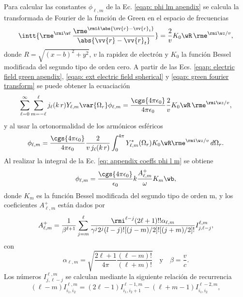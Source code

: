 Para calcular las constantes $\phi_{\ell, m}$ de la Ec. \eqref{eqap: phi lm apendix} se calcula la transformada de Fourier de la función de Green en el espacio de frecuencias \cite{maciel2019electromagnetic}
\begin{equation}
\intt{\rme^{\rmi \w t} \,\frac{\rme^{\rmi k \abs{\vv{r}-\vv{r}_t}}}{\abs{\vv{r}-\vv{r}_t}}} = \frac{2}{v} K_0\wR \, \rme^{\rmi \w z/v},
\label{eqap: green fourier transform}
\end{equation}
donde $R = \sqrt{(x-b)^2+y^2}$, $v$ la rapidez de electrón y $K_0$ la función Bessel modificada del segundo tipo de orden cero. A partir de las Ecs. \eqref{eqap: electric field green apendix}, \eqref{eqap: ext electric field spherical} y \eqref{eqap: green fourier transform} se puede obtener la ecuaciación
\begin{equation}
\sum_{\ell=0}^{\infty}\sum_{m=-\ell}^{\ell} j_{\ell}(k \, r) Y_{\ell,m}\var{\Omega_r} \phi_{\ell, m} = \frac{\cgs{4\pi\epsilon_0}}{4\pi\epsilon_0}\frac{2}{v} K_0\wR \, \rme^{\rmi \w z/v},
\end{equation}
y al usar la ortonormalidad de los armónicos esféricos
\begin{equation}
\phi_{\ell,m} = \frac{\cgs{4\pi\epsilon_0}}{4\pi\epsilon_0}\frac{2}{v \,j_{\ell}(k\,r)} \int_{0}^{4\pi} Y_{\ell,m}^{*}(\Omega_r) K_0\wR \rme^{\rmi \w z /v} \, d\Omega_{r}.
\label{eq: appendix coeffs phi l m}
\end{equation}
Al realizar la integral de la Ec.  \eqref{eq: appendix coeffs phi l m} se obtiene \cite{de1999relativistic}
\begin{equation}
\phi_{\ell,m} = \frac{\cgs{4\pi\epsilon_0}}{\epsilon_0} k \frac{A_{\ell, m}^{+}}{\omega}K_m\wb,
\label{eq: phi lm GdA AlmKm}
\end{equation}
donde $K_m$ es la función Bessel modificada del segundo tipo de orden m, y los coeficientes $A_{\ell, m}^{+}$ están dados por
\begin{equation}
A_{\ell, m}^{+} = \frac{1}{\beta^{\ell +1}}\sum_{j=m}^{\ell}\frac{\rmi^{\ell - j} (2\ell + 1)!! \alpha_{\ell, m}}{\gamma^j 2^j (l-j)! [(j-m)/2]! [(j+m)/2]! } I_{j, \ell - j}^{\ell, m},
\end{equation}
con
\begin{equation}
\alpha_{\ell, m} = \sqrt{\frac{2\ell + 1}{4\pi}\frac{(\ell-m)!}{(\ell +m)!}} \quad \text{y} \quad \beta = \frac{v}{c}.
\end{equation}
Los números $I_{j, \ell - j}^{\ell, m}$ se calculan mediante la siguiente relación de recurrencia
\begin{equation}
(\ell - m) I_{i_1,i_2}^{\ell,m}=(2\ell-1)I_{i_1,i_2+1}^{\ell-1,m}-(\ell + m -1)I_{i_1,i_2}^{\ell-2,m},
\end{equation}
